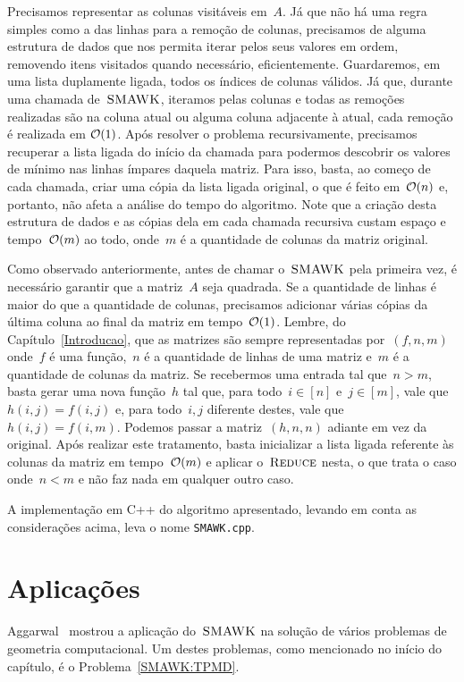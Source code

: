 Precisamos representar as colunas visitáveis em~$A$. Já que não há uma regra simples como a das linhas para a remoção de colunas, precisamos de alguma estrutura de dados que nos permita iterar pelos seus valores em ordem, removendo itens visitados quando necessário, eficientemente. Guardaremos, em uma lista duplamente ligada, todos os índices de colunas válidos. Já que, durante uma chamada de~$\textsc{SMAWK}$, iteramos pelas colunas e todas as remoções realizadas são na coluna atual ou alguma coluna adjacente à atual, cada remoção é realizada em $\mathcal{O}(1)$. Após resolver o problema recursivamente, precisamos recuperar a lista ligada do início da chamada para podermos descobrir os valores de mínimo nas linhas ímpares daquela matriz. Para isso, basta, ao começo de cada chamada, criar uma cópia da lista ligada original, o que é feito em~$\mathcal{O}(n)$ e, portanto, não afeta a análise do tempo do algoritmo. Note que a criação desta estrutura de dados e as cópias dela em cada chamada recursiva custam espaço e tempo~$\mathcal{O}(m)$ ao todo, onde~$m$ é a quantidade de colunas da matriz original.

Como observado anteriormente, antes de chamar o~$\textsc{SMAWK}$ pela primeira vez, é necessário garantir que a matriz~$A$ seja quadrada. Se a quantidade de linhas é maior do que a quantidade de colunas, precisamos adicionar várias cópias da última coluna ao final da matriz em tempo~$\mathcal{O}(1)$. Lembre, do Capítulo~\ref{Introducao}, que as matrizes são sempre representadas por~$(f,n,m)$ onde~$f$ é uma função,~$n$ é a quantidade de linhas de uma matriz e~$m$ é a quantidade de colunas da matriz. Se recebermos uma entrada tal que~${ n > m }$, basta gerar uma nova função~$h$ tal que, para todo~${ i \in [n] }$ e~${ j \in [m] }$, vale que~${ h(i,j) = f(i,j) }$ e, para todo~$i,j$ diferente destes, vale que~${ h(i,j) = f(i,m) }$. Podemos passar a matriz~$(h,n,n)$ adiante em vez da original. Após realizar este tratamento, basta inicializar a lista ligada referente às colunas da matriz em tempo~$\mathcal{O}(m)$ e aplicar o~$\textsc{Reduce}$ nesta, o que trata o caso onde~${ n < m }$ e não faz nada em qualquer outro caso.
 
A implementação em C++ do algoritmo apresentado, levando em conta as considerações acima, leva o nome \texttt{SMAWK.cpp}.


\section{Aplicações} \label{SMAWK:Appl}
Aggarwal~\cite{Aggarwal:1987} mostrou a aplicação do~$\textsc{SMAWK}$ na solução de vários problemas de geometria computacional. Um destes problemas, como mencionado no início do capítulo, é o Problema~\ref{SMAWK:TPMD}.


